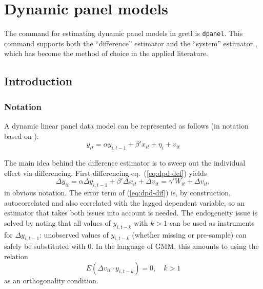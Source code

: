 \chapter{Dynamic panel models}
\label{chap:dpanel}

\newcommand{\by}{\boldsymbol{y}}
\newcommand{\bx}{\boldsymbol{x}}
\newcommand{\bv}{\boldsymbol{v}}
\newcommand{\bX}{\boldsymbol{X}}
\newcommand{\bW}{\boldsymbol{W}}
\newcommand{\bZ}{\boldsymbol{Z}}
\newcommand{\bA}{\boldsymbol{A}}
\newcommand{\biota}{\bm{\iota}}

\newenvironment%
{altcode}%
{\vspace{1ex}\small\leftmargin 1em}{\vspace{1ex}}

The command for estimating dynamic panel models in gretl is
\texttt{dpanel}. This command supports both the ``difference''
estimator \citep{arellano-bond91} and the ``system'' estimator
\citep{blundell-bond98}, which has become the method of choice in the
applied literature.

\section{Introduction}
\label{sec:dpanel-intro}

\subsection{Notation}
\label{sec:dpanel-notation}

A dynamic linear panel data model can be represented as follows
(in notation based on \cite{arellano03}):
\begin{equation}
  \label{eq:dpd-def}
  y_{it} = \alpha y_{i,t-1} + \beta'x_{it} + \eta_{i} + v_{it}
\end{equation}

The main idea behind the difference estimator is to sweep out the
individual effect via differencing.  First-differencing eq.\
(\ref{eq:dpd-def}) yields
\begin{equation}
  \label{eq:dpd-dif}
  \Delta y_{it} = \alpha \Delta y_{i,t-1} + \beta'\Delta x_{it} +
  \Delta v_{it} = \gamma' W_{it} + \Delta v_{it} ,
\end{equation}
in obvious notation. The error term of (\ref{eq:dpd-dif}) is, by
construction, autocorrelated and also correlated with the lagged
dependent variable, so an estimator that takes both issues into
account is needed. The endogeneity issue is solved by noting that all
values of $y_{i,t-k}$ with $k>1$ can be used as instruments for
$\Delta y_{i,t-1}$: unobserved values of $y_{i,t-k}$ (whether missing
or pre-sample) can safely be substituted with 0. In the language of
GMM, this amounts to using the relation
\begin{equation}
  \label{eq:OC-dif}
  E(\Delta v_{it} \cdot y_{i,t-k}) = 0, \quad k>1
\end{equation}
as an orthogonality condition.

